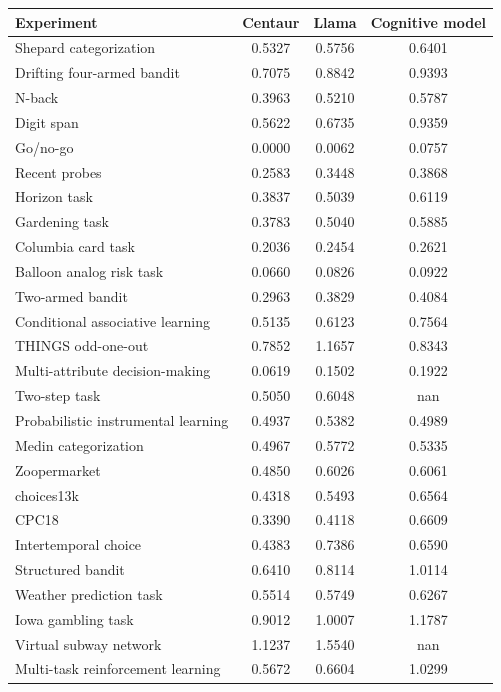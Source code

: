 \documentclass[pdflatex,sn-nature]{sn-jnl}%
\theoremstyle{thmstyleone}%
\theoremstyle{thmstyletwo}%
\theoremstyle{thmstylethree}%
\begin{document}
\begin{table}[h]
\centering 
\begin{tabular}{@{}lccc@{}} 
\toprule  
\textbf{Experiment} & \textbf{Centaur} & \textbf{Llama} & \textbf{Cognitive model} \\ 
\midrule 
Shepard categorization & 0.5327 & 0.5756 & 0.6401 \\ 
Drifting four-armed bandit & 0.7075 & 0.8842 & 0.9393 \\ 
N-back & 0.3963 & 0.5210 & 0.5787 \\ 
Digit span & 0.5622 & 0.6735 & 0.9359 \\ 
Go/no-go & 0.0000 & 0.0062 & 0.0757 \\ 
Recent probes & 0.2583 & 0.3448 & 0.3868 \\ 
Horizon task & 0.3837 & 0.5039 & 0.6119 \\ 
Gardening task & 0.3783 & 0.5040 & 0.5885 \\ 
Columbia card task & 0.2036 & 0.2454 & 0.2621 \\ 
Balloon analog risk task & 0.0660 & 0.0826 & 0.0922 \\ 
Two-armed bandit & 0.2963 & 0.3829 & 0.4084 \\ 
Conditional associative learning & 0.5135 & 0.6123 & 0.7564 \\ 
THINGS odd-one-out & 0.7852 & 1.1657 & 0.8343 \\ 
Multi-attribute decision-making & 0.0619 & 0.1502 & 0.1922 \\ 
Two-step task & 0.5050 & 0.6048 & nan \\ 
Probabilistic instrumental learning & 0.4937 & 0.5382 & 0.4989 \\ 
Medin categorization & 0.4967 & 0.5772 & 0.5335 \\ 
Zoopermarket & 0.4850 & 0.6026 & 0.6061 \\ 
choices13k & 0.4318 & 0.5493 & 0.6564 \\ 
CPC18 & 0.3390 & 0.4118 & 0.6609 \\ 
Intertemporal choice & 0.4383 & 0.7386 & 0.6590 \\ 
Structured bandit & 0.6410 & 0.8114 & 1.0114 \\ 
Weather prediction task & 0.5514 & 0.5749 & 0.6267 \\ 
Iowa gambling task & 0.9012 & 1.0007 & 1.1787 \\ 
Virtual subway network & 1.1237 & 1.5540 & nan \\ 
Multi-task reinforcement learning & 0.5672 & 0.6604 & 1.0299 \\ 

\end{tabular}
\end{table}
\end{document}
